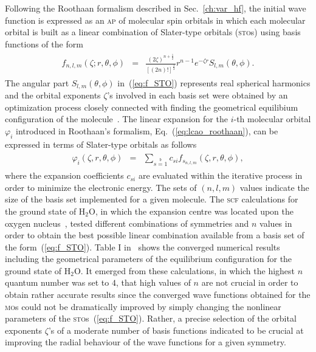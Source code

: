 Following the Roothaan formalism described in Sec.~\ref{ch:var_hf},
the initial wave function is expressed as an \textsc{ap} of molecular
spin orbitals in which each molecular orbital is built as a linear
combination of Slater-type orbitals (\textsc{sto}s) using basis
functions of the form
%
\begin{eqnarray}
  \begin{split}
    f_{n,l,m}(\zeta;r,\theta,\phi) & = &
    \frac{(2\zeta)^{n + \frac{1}{2}}}{[(2n)!]^{\frac{1}{2}}} r^{n-1} e^{-\zeta r}
    S_{l,m}(\theta,\phi).
  \end{split}
  \label{eq:f_STO}
\end{eqnarray}
%
The angular part $S_{l,m}(\theta,\phi)$ in~(\ref{eq:f_STO}) represents
real spherical harmonics and the orbital exponents $\zeta$'s involved
in each basis set were obtained by an optimization process closely
connected with finding the geometrical equilibium configuration of the
molecule~\cite{Moccia_JCP_2164,Moccia_1964}. The linear expansion for
the $i$-th molecular orbital $\varphi_{i}$ introduced in Roothaan's
formalism, Eq.~(\ref{eq:lcao_roothaan}), can be expressed in terms of
Slater-type orbitals as follows
%
\begin{eqnarray}
  \begin{split}
    \varphi_{i}(\zeta,r,\theta,\phi) & = &
    \sum\limits_{s=1}\limits^{b} c_{si} f_{s_{n,l,m}}(\zeta,r,\theta,\phi),
  \end{split}
  \label{eq:STO_expansion}
\end{eqnarray}
%
where the expansion coefficients $c_{si}$ are evaluated within the
iterative process in order to minimize the electronic energy.  The
sets of $(n,l,m)$ values indicate the size of the basis set
implemented for a given molecule.
The \textsc{scf} calculations for the ground state of H$_{2}$O, in
which the expansion centre was located upon the oxygen
nucleus~\cite{Moccia_1964}, tested different combinations of
symmetries and $n$ values in order to obtain the best possible linear
combination available from a basis set of the
form~(\ref{eq:f_STO}). Table I in~\cite{Moccia_1964} shows the
converged numerical results including the geometrical parameters of
the equilibrium configuration for the ground state of H$_{2}$O. It
emerged from these calculations, in which the highest $n$ quantum
number was set to $4$, that high values of $n$ are not crucial in
order to obtain rather accurate results since the converged wave
functions obtained for the \textsc{mo}s could not be dramatically
improved by simply changing the nonlinear parameters of the
\textsc{sto}s~(\ref{eq:f_STO}). Rather, a precise selection of the
orbital exponents $\zeta$'s of a moderate number of basis functions
indicated to be crucial at improving the radial behaviour of the wave
functions for a given symmetry.

